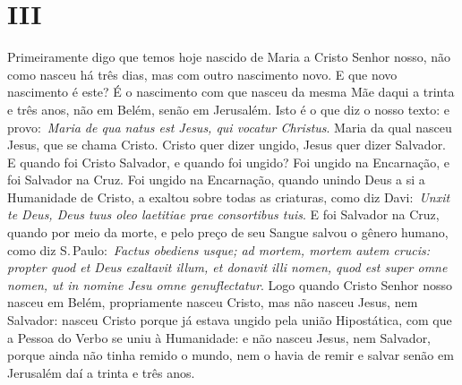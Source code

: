 \section*{III}

Primeiramente digo que temos hoje nascido de Maria a Cristo
Senhor nosso, não como nasceu há três dias, mas com outro nascimento
novo. E que novo nascimento é este? É o nascimento com que nasceu da
mesma Mãe daqui a trinta e três anos, não em Belém, senão em Jerusalém.
Isto é o que diz o nosso texto: e provo:~\emph{Maria de qua natus est
Jesus, qui vocatur Christus}. Maria da qual nasceu Jesus, que se chama
Cristo. Cristo quer dizer ungido, Jesus quer dizer Salvador. E quando
foi Cristo Salvador, e quando foi ungido? Foi ungido na Encarnação, e
foi Salvador na Cruz. Foi ungido na Encarnação, quando unindo Deus a si
a Humanidade de Cristo, a exaltou sobre todas as criaturas, como diz
Davi:~\emph{Unxit te Deus, Deus tuus oleo laetitiae prae consortibus
tuis}. E foi Salvador na Cruz, quando por meio da
morte, e pelo preço de seu Sangue salvou o gênero humano, como diz S.\,Paulo:~\emph{Factus obediens usque; ad mortem, mortem autem crucis:
propter quod et Deus exaltavit illum, et donavit illi nomen, quod est
super omne nomen, ut in nomine Jesu omne
genuflectatur}. Logo quando Cristo Senhor nosso nasceu
em Belém, propriamente nasceu Cristo, mas não nasceu Jesus, nem
Salvador: nasceu Cristo porque já estava ungido pela união Hipostática,
com que a Pessoa do Verbo se uniu à Humanidade: e não nasceu Jesus, nem
Salvador, porque ainda não tinha remido o mundo, nem o havia de remir e
salvar senão em Jerusalém daí a trinta e três anos.



